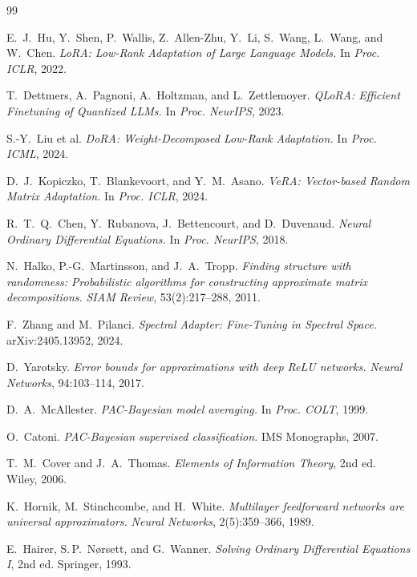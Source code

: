 \documentclass[conference]{IEEEtran}
\begin{document}

\begin{thebibliography}{99}

E.~J.~Hu, Y.~Shen, P.~Wallis, Z.~Allen-Zhu, Y.~Li, S.~Wang, L.~Wang, and W.~Chen.
\textit{LoRA: Low-Rank Adaptation of Large Language Models.}
In \textit{Proc. ICLR}, 2022.

T.~Dettmers, A.~Pagnoni, A.~Holtzman, and L.~Zettlemoyer.
\textit{QLoRA: Efficient Finetuning of Quantized LLMs.}
In \textit{Proc. NeurIPS}, 2023.

S.-Y.~Liu et al.
\textit{DoRA: Weight-Decomposed Low-Rank Adaptation.}
In \textit{Proc. ICML}, 2024.

D.~J.~Kopiczko, T.~Blankevoort, and Y.~M.~Asano.
\textit{VeRA: Vector-based Random Matrix Adaptation.}
In \textit{Proc. ICLR}, 2024.

R.~T.~Q.~Chen, Y.~Rubanova, J.~Bettencourt, and D.~Duvenaud.
\textit{Neural Ordinary Differential Equations.}
In \textit{Proc. NeurIPS}, 2018.

N.~Halko, P.-G.~Martinsson, and J.~A.~Tropp.
\textit{Finding structure with randomness: Probabilistic algorithms for constructing approximate matrix decompositions.}
\textit{SIAM Review}, 53(2):217--288, 2011.

F.~Zhang and M.~Pilanci.
\textit{Spectral Adapter: Fine-Tuning in Spectral Space.}
arXiv:2405.13952, 2024.

D.~Yarotsky.
\textit{Error bounds for approximations with deep ReLU networks.}
\textit{Neural Networks}, 94:103--114, 2017.

D.~A.~McAllester.
\textit{PAC-Bayesian model averaging.}
In \textit{Proc. COLT}, 1999.

O.~Catoni.
\textit{PAC-Bayesian supervised classification.}
IMS Monographs, 2007.

T.~M.~Cover and J.~A.~Thomas.
\textit{Elements of Information Theory}, 2nd ed.
Wiley, 2006.

K.~Hornik, M.~Stinchcombe, and H.~White.
\textit{Multilayer feedforward networks are universal approximators.}
\textit{Neural Networks}, 2(5):359--366, 1989.

E.~Hairer, S.\,P.~N{\o}rsett, and G.~Wanner.
\textit{Solving Ordinary Differential Equations I}, 2nd ed.
Springer, 1993.


\end{thebibliography}
\end{document}
